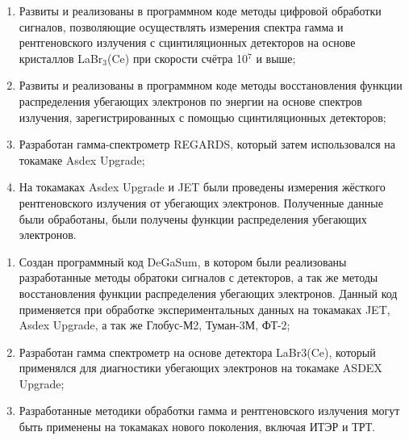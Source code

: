 {\novelty}
\begin{enumerate}[beginpenalty=10000] %
  \item Развиты и реализованы в программном коде методы цифровой обработки сигналов, позволяющие осуществлять измерения спектра гамма и рентгеновского излучения с сцинтиляционных детекторов на основе кристаллов LaBr${}_3$(Ce) при скорости счётра 10${}^7$ и выше;
  \item Развиты и реализованы в программном коде методы восстановления функции распределения убегающих электронов по энергии на основе спектров излучения, зарегистрированных с помощью сцинтиляционных детекторов;
  \item Разработан гамма-спектрометр REGARDS, который затем использовался на токамаке Asdex Upgrade;
  \item На токамаках Asdex Upgrade и JET были проведены измерения  жёсткого рентгеновского излучения от убегающих электронов. Полученные данные были обработаны, были получены функции распределения убегающих электронов. 
\end{enumerate}

{\influence}\begin{enumerate}[beginpenalty=10000]
  \item Создан программный код DeGaSum, в котором были реализованы разработанные методы обратоки сигналов с детекторов, а так же методы восстановления функции распределения убегающих электронов. Данный код  применяется при обработке экспериментальных данных на токамаках JET, Asdex Upgrade, а так же Глобус-М2, Туман-3М, ФТ-2;
  \item Разработан гамма спектрометр на основе детектора LaBr3(Ce), который применялся для диагностики убегающих электронов на токамаке ASDEX Upgrade;
  \item Разработанные методики обработки гамма и рентгеновского излучения могут быть применены на токамаках нового поколения, включая ИТЭР и ТРТ.
\end{enumerate}

{\methods} 

